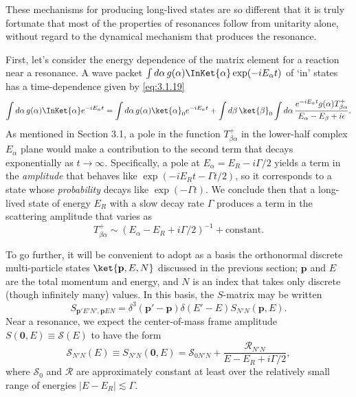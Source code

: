 These mechanisms for producing long-lived states are so different that it is
truly fortunate that most of the properties of resonances follow from
unitarity alone, without regard to the dynamical mechanism that produces the
resonance.

First, let's consider the energy dependence of the matrix element for a
reaction near a resonance. A wave packet
$\int d\alpha\,g(\alpha)\InKet{\alpha}\exp(-iE_\alpha t)$ of `in'
states has a time-dependence given by \eqref{eq:3.1.19}
\[
  \int d\alpha\,g(\alpha)\InKet{\alpha}e^{-iE_\alpha t}
  =\int d\alpha\,g(\alpha)\ket{\alpha}_0e^{-iE_\alpha t}
  +\int d\beta\,\ket{\beta}_0\int d\alpha\,
   \frac{e^{-iE_\alpha t}g(\alpha)T^+_{\beta\alpha}}
        {E_\alpha-E_\beta+i\epsilon}.
\]
As mentioned in Section 3.1, a pole in the function $T^+_{\beta\alpha}$ in
the lower-half complex $E_\alpha$ plane would make a contribution to the
second term that decays exponentially as $t\to\infty$. Specifically, a pole
at $E_\alpha=E_R-i\Gamma/2$ yields a term in the \emph{amplitude} that behaves
like $\exp(-iE_Rt-\Gamma t/2)$, so it corresponds to a state whose
\emph{probability} decays like $\exp(-\Gamma t)$. We conclude then that a
long-lived state of energy $E_R$ with a slow decay rate $\Gamma$ produces a
term in the scattering amplitude that varies as
\begin{equation}
  T^+_{\beta\alpha}\sim(E_\alpha-E_R+i\Gamma/2)^{-1}+\text{constant}.
  \tag{3.8.1}\label{eq:3.8.1}
\end{equation}

To go further, it will be convenient to adopt as a basis the orthonormal
discrete multi-particle states $\ket{\mathbf p,E,N}$ discussed in the previous
section; $\mathbf p$ and $E$ are the total momentum and energy, and $N$ is an
index that takes only discrete (though infinitely many) values. In this basis,
the $S$-matrix may be written
\begin{equation}
  S_{\mathbf p'E'N',\mathbf pEN}
  =\delta^3(\mathbf p'-\mathbf p)\delta(E'-E)S_{N'N}(\mathbf p,E).
  \tag{3.8.2}\label{eq:3.8.2}
\end{equation}
Near a resonance, we expect the center-of-mass frame amplitude
$S(\mathbf0,E)\equiv\mathcal S(E)$ to have the form
\begin{equation}
  \mathcal S_{N'N}(E)\equiv S_{N'N}(\mathbf0,E)
  =\mathcal S_{0N'N}+\frac{\mathcal R_{N'N}}{E-E_R+i\Gamma/2},
  \tag{3.8.3}\label{eq:3.8.3}
\end{equation}
where $\mathcal S_0$ and $\mathcal R$ are approximately constant at least over
the relatively small range of energies $|E-E_R|\lesssim\Gamma$.

